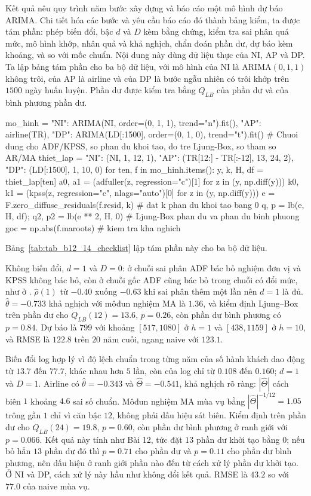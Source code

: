  Kết quả  nêu quy trình năm bước xây dựng và báo cáo một mô hình dự báo ARIMA. Chi tiết hóa các bước và yêu cầu báo cáo đó thành bảng kiểm, ta được tám phần: phép biến đổi, bậc $d$ và $D$ kèm bằng chứng, kiểm tra sai phân quá mức, mô hình khớp, nhân quả và khả nghịch, chẩn đoán phần dư, dự báo kèm khoảng, và so với mốc chuẩn.
 Nội dung này dùng dữ liệu thực của NI, AP và DP. Ta lập bảng tám phần cho ba bộ dữ liệu, với mô hình của NI là ARIMA$(0,1,1)$ không trôi, của AP là airline và của DP là bước ngẫu nhiên có trôi khớp trên $1500$ ngày huấn luyện. Phần dư được kiểm tra bằng $Q_{LB}$ của phần dư và của bình phương phần dư.
\begin{codeblock}
mo_hinh = {"NI": ARIMA(NI, order=(0, 1, 1), trend="n").fit(), "AP": airline(TR),
           "DP": ARIMA(LD[:1500], order=(0, 1, 0), trend="t").fit()}
# Chuoi dung cho ADF/KPSS, so phan du khoi tao, do tre Ljung-Box, so tham so AR/MA
thiet_lap = {"NI": (NI, 1, 12, 1), "AP": (TR[12:] - TR[:-12], 13, 24, 2),
             "DP": (LD[:1500], 1, 10, 0)}
for ten, f in mo_hinh.items():
    y, k, H, df = thiet_lap[ten]
    a0, a1 = (adfuller(z, regression="c")[1] for z in (y, np.diff(y)))
    k0, k1 = (kpss(z, regression="c", nlags="auto")[0] for z in (y, np.diff(y)))
    e = F.zero_diffuse_residuals(f.resid, k)        # dat k phan du khoi tao bang 0
    q, p = lb(e, H, df); q2, p2 = lb(e ** 2, H, 0)  # Ljung-Box phan du va phan du binh phuong
    goc = np.abs(f.maroots)                          # kiem tra kha nghich
\end{codeblock}
 Bảng~\ref{tab:tab_b12_14_checklist} lập tám phần này cho ba bộ dữ liệu.

 Không biến đổi, $d=1$ và $D=0$: ở chuỗi sai phân ADF bác bỏ nghiệm đơn vị và KPSS không bác bỏ, còn ở chuỗi gốc ADF cũng bác bỏ trong chuỗi có đổi mức, như ở . $\hat\rho(1)$ từ $-0.40$ xuống $-0.63$ khi sai phân thêm một lần nên $d=1$ là đủ. $\hat\theta=-0.733$ khả nghịch với môđun nghiệm MA là $1.36$, và kiểm định Ljung--Box trên phần dư cho $Q_{LB}(12)=13.6$, $p=0.26$, còn phần dư bình phương có $p=0.84$. Dự báo là $799$ với khoảng $[517,1080]$ ở $h=1$ và $[438,1159]$ ở $h=10$, và RMSE là $122.8$ trên $20$ năm cuối, ngang naive với $123.1$.

 Biến đổi log hợp lý vì độ lệch chuẩn trong từng năm của số hành khách dao động từ $13.7$ đến $77.7$, khác nhau hơn $5$ lần, còn của log chỉ từ $0.108$ đến $0.160$; $d=1$ và $D=1$. Airline có $\hat\theta=-0.343$ và $\hat\Theta=-0.541$, khả nghịch rõ ràng: $|\hat\Theta|$ cách biên $1$ khoảng $4.6$ sai số chuẩn. Môđun nghiệm MA mùa vụ bằng $|\hat\Theta|^{-1/12}=1.05$ trông gần $1$ chỉ vì căn bậc $12$, không phải dấu hiệu sát biên. Kiểm định trên phần dư cho $Q_{LB}(24)=19.8$, $p=0.60$, còn phần dư bình phương ở ranh giới với $p=0.066$. Kết quả này tính như Bài 12, tức đặt $13$ phần dư khởi tạo bằng $0$; nếu bỏ hẳn $13$ phần dư đó thì $p=0.71$ cho phần dư và $p=0.11$ cho phần dư bình phương, nên dấu hiệu ở ranh giới phần nào đến từ cách xử lý phần dư khởi tạo. Ở NI và DP, cách xử lý này hầu như không đổi kết quả. RMSE là $43.2$ so với $77.0$ của naive mùa vụ.


